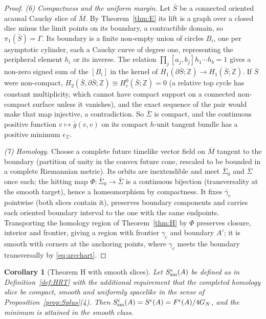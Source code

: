 \documentclass[aps,prd,onecolumn,superscriptaddress,nofootinbib,amsmath,amssymb,11pt]{revtex4-2}
\newtheorem{corollary}[theorem]{Corollary}
\theoremstyle{definition}
\newcommand{\Z}{\mathbb{Z}}
\newcommand{\eps}{\epsilon}
\newcommand{\Mbar}{\overline{M}}
\begin{document}
\begin{proof}
\emph{(6) Compactness and the uniform margin.} Let $\bar S$ be a connected oriented acausal Cauchy slice of $\Mbar$. By
Theorem~\ref{thm:E} its lift is a graph over a closed disc minus the limit points on its boundary, a contractible domain, so
$\pi_1(\bar S)=\Gamma$. Its boundary is a finite non-empty union of circles $B_i$, one per asymptotic cylinder, each a Cauchy curve of
degree one, representing the peripheral element $h_i$ or its inverse. The relation $\prod_j[a_j,b_j]h_1\cdots h_b=1$ gives a non-zero
signed sum of the $[B_i]$ in the kernel of $H_1(\partial\bar S;\Z)\to H_1(\bar S;\Z)$. If $\bar S$ were non-compact,
$H_2(\bar S,\partial\bar S;\Z)\cong H^0_c(\bar S;\Z)=0$ (a relative top cycle has constant multiplicity, which cannot have compact
support on a connected non-compact surface unless it vanishes), and the exact sequence of the pair would make that map
injective, a contradiction. So $\bar\Sigma$ is compact, and the continuous positive function $v\mapsto\bar g(v,v)$ on its compact
$h$-unit tangent bundle has a positive minimum $\epsilon_\Sigma$.

\emph{(7) Homology.} Choose a complete future timelike vector field on $\Mbar$ tangent to the boundary (partition of unity in the
convex future cone, rescaled to be bounded in a complete Riemannian metric). Its orbits are inextendible and meet $\bar\Sigma_0$ and
$\bar\Sigma$ once each; the hitting map $\Phi:\bar\Sigma_0\to\bar\Sigma$ is a continuous bijection (transversality at the smooth target),
hence a homeomorphism by compactness. It fixes $\bar\gamma_c$ pointwise (both slices contain it), preserves boundary components and
carries each oriented boundary interval to the one with the same endpoints. Transporting the homology region of
Theorem~\ref{thm:H} by $\Phi$ preserves closure, interior and frontier, giving a region with frontier $\gamma_c$ and boundary
$A'$; it is smooth with corners at the anchoring points, where $\gamma_c$ meets the boundary transversally by
\eqref{eq:arcchart}.
\end{proof}

\begin{corollary}[Theorem H with smooth slices]\label{cor:smoothH}
Let $S^\eps_{\rm sm}(A)$ be defined as in Definition~\ref{def:HRT} with the additional requirement that the completed homology
slice be compact, smooth and uniformly spacelike in the sense of Proposition~\ref{prop:Splus}(4). Then
$S^\eps_{\rm sm}(A)=S^\eps(A)=F^\eps(A)/4G_N$, and the minimum is attained in the smooth class.
\end{corollary}
\end{document}
